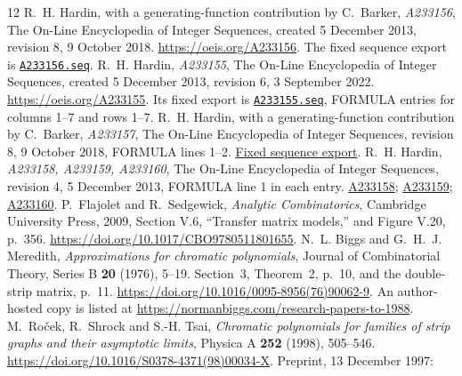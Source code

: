 \documentclass[11pt,a4paper]{article}
\begin{document}
\begin{thebibliography}{12}
\small
{}
R.~H. Hardin, with a generating-function contribution by C.~Barker,
\emph{A233156}, The On-Line Encyclopedia of Integer Sequences,
created 5 December 2013, revision 8, 9 October 2018.
\url{https://oeis.org/A233156}.
The fixed sequence export is
\href{https://raw.githubusercontent.com/oeis/oeisdata/571197984aeda7b8b680fe3a1f6a43f9898cd441/seq/A233/A233156.seq}{\texttt{A233156.seq}}.
R.~H. Hardin, \emph{A233155}, The On-Line Encyclopedia of Integer
Sequences, created 5 December 2013, revision 6, 3 September 2022.
\url{https://oeis.org/A233155}.
Its fixed export is
\href{https://raw.githubusercontent.com/oeis/oeisdata/571197984aeda7b8b680fe3a1f6a43f9898cd441/seq/A233/A233155.seq}{\texttt{A233155.seq}},
FORMULA entries for columns 1--7 and rows 1--7.
R.~H. Hardin, with a generating-function contribution by C.~Barker,
\emph{A233157}, The On-Line Encyclopedia of Integer Sequences,
revision 8, 9 October 2018, FORMULA lines 1--2.
\href{https://raw.githubusercontent.com/oeis/oeisdata/571197984aeda7b8b680fe3a1f6a43f9898cd441/seq/A233/A233157.seq}{Fixed sequence export}.
R.~H. Hardin, \emph{A233158, A233159, A233160}, The On-Line
Encyclopedia of Integer Sequences, revision 4, 5 December 2013,
FORMULA line 1 in each entry.
\href{https://raw.githubusercontent.com/oeis/oeisdata/571197984aeda7b8b680fe3a1f6a43f9898cd441/seq/A233/A233158.seq}{A233158};
\href{https://raw.githubusercontent.com/oeis/oeisdata/571197984aeda7b8b680fe3a1f6a43f9898cd441/seq/A233/A233159.seq}{A233159};
\href{https://raw.githubusercontent.com/oeis/oeisdata/571197984aeda7b8b680fe3a1f6a43f9898cd441/seq/A233/A233160.seq}{A233160}.
P.~Flajolet and R.~Sedgewick, \emph{Analytic Combinatorics},
Cambridge University Press, 2009, Section V.6, ``Transfer matrix models,''
and Figure V.20, p.~356. \url{https://doi.org/10.1017/CBO9780511801655}.
N.~L. Biggs and G.~H.~J. Meredith, \emph{Approximations for chromatic
polynomials}, Journal of Combinatorial Theory, Series B \textbf{20}
(1976), 5--19. Section~3, Theorem~2, p.~10, and the double-strip
matrix, p.~11. \url{https://doi.org/10.1016/0095-8956(76)90062-9}.
An author-hosted copy is listed at
\url{https://normanbiggs.com/research-papers-to-1988}.
M.~Ro\v{c}ek, R.~Shrock and S.-H. Tsai, \emph{Chromatic polynomials
for families of strip graphs and their asymptotic limits}, Physica A
\textbf{252} (1998), 505--546.
\url{https://doi.org/10.1016/S0378-4371(98)00034-X}.
Preprint, 13 December 1997:

\end{thebibliography}
\end{document}
